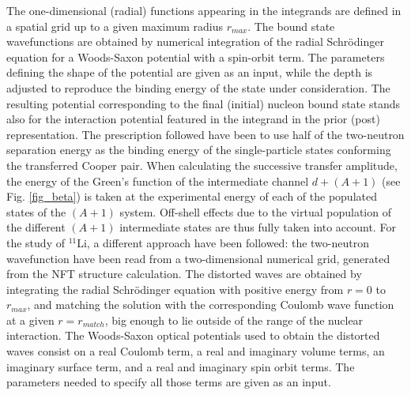 \begin{subappendices}
The one-dimensional (radial) functions appearing in the integrands are defined in a spatial grid up to a given maximum radius $r_{max}$. The bound state  wavefunctions are obtained by numerical integration of the radial Schr\"odinger equation for a Woods-Saxon potential with a spin-orbit term. The parameters defining the shape of the potential are given as an input, while the depth is adjusted to reproduce the binding energy of the state under consideration. The resulting potential corresponding to the final (initial) nucleon bound state stands also for the interaction potential featured in the integrand in the prior (post) representation.
The  prescription followed have been to use half of the two-neutron  separation energy as  the binding energy of the single-particle states conforming the transferred Cooper pair. When calculating the successive transfer amplitude, the energy of the Green's function of the intermediate channel $d+ (A+1)$ (see Fig. \ref{fig_beta}) is taken at the experimental energy of each of the populated states of the $(A+1)$ system. Off-shell effects due to the virtual population of the different $(A+1)$ intermediate states are thus fully taken into account. For the study of $^{11}$Li, a different approach have been followed:  the  two-neutron wavefunction have been read from a two-dimensional numerical grid, generated from the  NFT structure calculation.
 The distorted waves are obtained by integrating the radial Schr\"odinger equation with positive energy from $r=0$ to $r_{max}$, and matching the solution with the corresponding Coulomb wave function at a given $r=r_{match}$, big enough to lie outside of the range of the nuclear interaction. The  Woods-Saxon optical potentials  used to obtain the distorted waves consist on a real Coulomb term, a real and imaginary volume terms, an imaginary surface term, and a real and imaginary spin orbit terms. The parameters needed to specify all those terms are given as an input.  

   


\end{subappendices}
